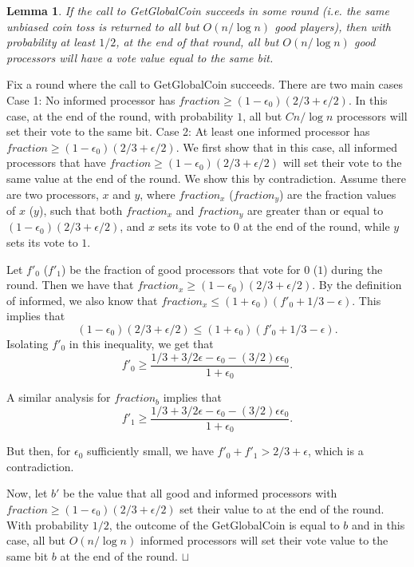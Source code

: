 \documentclass[letterpaper,11pt]{article}
\newtheorem{lemma}{Lemma}
\newcommand{\sq}{\hbox{\rlap{$\sqcap$}$\sqcup$}}
\newcommand{\qed}{\hspace*{\fill}\sq}
\newenvironment{proof}{\noindent {\bf Proof:}}{\qed\par\vskip 4mm\par}
\begin{document}
\begin{lemma} \label{l:term}
If the call to GetGlobalCoin succeeds in some round (i.e. the same unbiased coin toss is returned to all but $O(n/\log n)$ good players), then with probability at least $1/2$, at the end of that round, all but $O(n/ \log n)$ good processors will have a vote value equal to the same bit.
\end{lemma}

\begin{proof}
Fix a round where the call to GetGlobalCoin succeeds.  There are two main cases\\
\noindent
Case 1: No informed processor has $fraction \geq (1-\epsilon_{0}) (2/3 + \epsilon/2)$.  In this case, at the end of the round, with probability $1$, all but $Cn/\log n$ processors will set their vote to the same bit.
\noindent
Case 2: At least one informed processor has $fraction \geq (1-\epsilon_{0}) (2/3 + \epsilon/2)$.  We first show that in this case, all informed processors that have 
$fraction \geq (1-\epsilon_{0}) (2/3 + \epsilon/2)$ will set their vote to the same value at the end of the round.  We show this by contradiction.  Assume there are two processors, $x$ and $y$, where $fraction_{x}$ ($fraction_{y}$) are the fraction values of $x$ ($y$), such that both $fraction_{x}$ and $fraction_{y}$ are greater than or equal to $(1-\epsilon_{0}) (2/3 + \epsilon/2)$, and $x$ sets its vote to $0$ at the end of the round, while $y$ sets its vote to $1$.

Let $f'_{0}$ ($f'_{1}$) be the fraction of good processors that vote for $0$ ($1$) during the round.  Then we have that $fraction_{x} \geq (1-\epsilon_{0}) (2/3 + \epsilon/2)$.  By the definition of informed, we also know that $fraction_{x} \leq (1+\epsilon_{0}) (f'_{0} + 1/3 - \epsilon)$.  This implies that
$$ (1-\epsilon_{0})(2/3 + \epsilon/2) \leq (1+\epsilon_{0})(f'_{0} + 1/3 - \epsilon). $$  Isolating $f'_{0}$ in this inequality, we get that
$$f'_{0} \geq \frac{1/3 + 3/2 \epsilon - \epsilon_{0} - (3/2) \epsilon \epsilon_{0}}{1+\epsilon_{0}}.$$

A similar analysis for $fraction_{b}$ implies that
$$ f'_{1} \geq \frac{1/3 + 3/2 \epsilon - \epsilon_{0} - (3/2) \epsilon \epsilon_{0}}{1+\epsilon_{0}}.$$

But then, for $\epsilon_{0}$ sufficiently small, we have $f'_{0} + f'_{1} > 2/3 + \epsilon$, which is a contradiction.  

Now, let $b'$ be the value that all good and informed processors with $fraction \geq (1-\epsilon_{0}) (2/3 + \epsilon/2)$ set their value to at the end of the round.   With probability $1/2$, the outcome of the GetGlobalCoin is equal to $b$ and in this case, all but $O(n/ \log n)$ informed processors will set their vote value to the same bit $b$ at the end of the round.
\end{proof}
\end{document}
